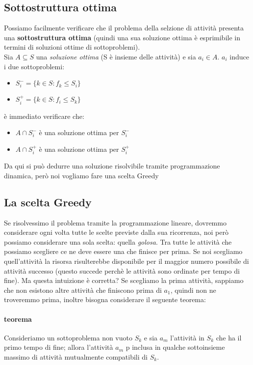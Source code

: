 \documentclass[12pt, a4paper, openany]{book}
\begin{document}
\subsection*{Sottostruttura ottima}
Possiamo facilmente verificare che il problema della selzione di attività presenta una \textbf{sottostruttura ottima} (quindi una sua soluzione ottima è esprimibile in termini di soluzioni ottime di sottoproblemi).
\\Sia $A \subseteq S$ una \emph{soluzione ottima} (S è insieme delle attività) e sia $a_i \in A$. $a_i$ induce i due sottoproblemi:
\begin{itemize}
	\item $S^-_i = \{k \in S : f_k \leq S_i\}$
	\item $S^+_i = \{k \in S : f_i \leq S_k\}$
\end{itemize}
è immediato verificare che:
\begin{itemize}
	\item $A \cap S^-_i$ è una soluzione ottima per $S^-_i$
	\item $A \cap S^+_i$ è una soluzione ottima per $S^+_i$
\end{itemize}
Da qui si può dedurre una soluzione risolvibile tramite programmazione dinamica, però noi vogliamo fare una scelta Greedy

\subsection*{La scelta Greedy}
Se risolvessimo il problema tramite la programmazione lineare, dovremmo considerare ogni volta tutte le scelte previste dalla sua ricorrenza, noi però possiamo considerare una sola scelta: quella \emph{golosa}.
Tra tutte le attività che possiamo scegliere ce ne deve essere una che finisce per prima. Se noi scegliamo quell'attività la risorsa risulterebbe disponibile per il maggior numero possibile di attività successo (questo succede perchè le attività sono ordinate per tempo di fine).
Ma questa intuizione è corretta? Se scegliamo la prima attività, sappiamo che non esistono altre attività che finiscono prima di $a_1$, quindi non ne troveremmo prima, inoltre bisogna considerare il seguente teorema:
\paragraph*{teorema} Consideriamo un sottoproblema non vuoto $S_k$ e sia $a_m$ l'attività in $S_k$ che ha il primo tempo di fine; allora l'attività $a_m$ p inclusa in qualche sottoinsieme massimo di attività mutualmente compatibili di $S_k$.
\end{document}
